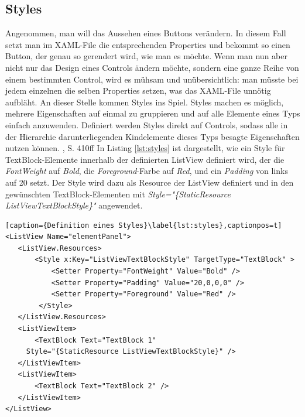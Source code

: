 \documentclass[a4paper,bibtotoc,oneside]{scrbook}
\begin{document}
\subsection[Styles]{Styles}\label{ref:styles}
Angenommen, man will das Aussehen eines Buttons verändern. In diesem Fall setzt man im XAML-File die entsprechenden Properties und bekommt so einen Button, der genau so gerendert wird, wie man es möchte.
\newline
Wenn man nun aber nicht nur das Design eines Controls ändern möchte, sondern eine ganze Reihe von einem bestimmten Control, wird es mühsam und unübersichtlich: man müsste bei jedem einzelnen die selben Properties setzen, was das XAML-File unnötig aufbläht.
\newline
An dieser Stelle kommen Styles ins Spiel.
\newline
\newline
Styles machen es möglich, mehrere Eigenschaften auf einmal zu gruppieren und auf alle Elemente eines Typs einfach anzuwenden. Definiert werden Styles direkt auf Controls, sodass alle in der Hierarchie darunterliegenden Kindelemente dieses Typs besagte Eigenschaften nutzen können. \cite{ana12}, S. 410ff
\newline
\newline
In Listing \ref{lst:styles} ist dargestellt, wie ein Style für TextBlock-Elemente innerhalb der definierten ListView definiert wird, der die \textit{FontWeight} auf \textit{Bold}, die \textit{Foreground}-Farbe auf \textit{Red}, und ein \textit{Padding} von links auf 20 setzt.
\newline
Der Style wird dazu als Resource der ListView definiert und in den gewünschten TextBlock-Elementen mit \textit{Style="\{StaticResource ListViewTextBlockStyle\}"} angewendet.
\newline
\begin{lstlisting}[caption={Definition eines Styles}\label{lst:styles},captionpos=t]
<ListView Name="elementPanel">
   <ListView.Resources>
       <Style x:Key="ListViewTextBlockStyle" TargetType="TextBlock" >
           <Setter Property="FontWeight" Value="Bold" />
           <Setter Property="Padding" Value="20,0,0,0" />
           <Setter Property="Foreground" Value="Red" />                         
        </Style>
   </ListView.Resources>
   <ListViewItem>
       <TextBlock Text="TextBlock 1"
	 Style="{StaticResource ListViewTextBlockStyle}" />
   </ListViewItem>
   <ListViewItem>
       <TextBlock Text="TextBlock 2" />
   </ListViewItem>
</ListView>
\end{lstlisting}
\end{document}
